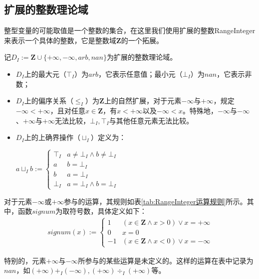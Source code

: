 \subsection{扩展的整数理论域}
\label{sec:Integer}

整型变量的可能取值是一个整数的集合，在这里我们使用扩展的整数RangeInteger来表示一个具体的整数，它是整数域$ \mathbf{Z} $的一个拓展。

\begin{definition}
	记$ D_I := \mathbf{Z} \cup \{ +\infty, -\infty, arb, nan\}  $为扩展的整数理论域。
	\begin{itemize}
		\item $ D_I $上的最大元（$ \top_I $）为$ arb $，它表示任意值；最小元（$ \bot_I $）为$ nan $，它表示非数；
		
		\item $ D_I $上的偏序关系（$ \le_I $）为$ \mathbf{Z} $上的自然扩展，对于元素$ -\infty $与$ +\infty $，规定$ -\infty < +\infty $，且对任意$ x \in \mathbf{Z} $，有$ x < +\infty $以及$ -\infty < x $。特殊地，$ -\infty $与$ -\infty $、$ +\infty $与$ +\infty $无法比较，$ \bot_I, \top_I $与其他任意元素无法比较。
		
		\item $ D_I $上的上确界操作（$ \sqcup_I $）定义为：\\
		\centerline{$ a \sqcup_I b := \begin{cases}
			\top_I & a \ne \bot_I \land b \ne \bot_I\\
			a & b = \bot_I\\
			b & a = \bot_I\\
			\bot_I & a = \bot_I \land b = \bot_I
			\end{cases} $}
	\end{itemize}
\end{definition}

对于元素$ -\infty $或$ +\infty $参与的运算，其规则如表\ref{tab:RangeInteger运算规则}所示。其中，函数$ signum $为取符号数，具体定义如下：
\begin{align}
	signum(x) := \begin{cases}
		1 & (x \in \mathbf{Z} \land x > 0) \lor x = +\infty\\
		0 & x = 0\\
		-1 & (x \in \mathbf{Z} \land x < 0) \lor x = -\infty
	\end{cases}
\end{align}

特别的，元素$ +\infty $与$ -\infty $所参与的某些运算是未定义的。这样的运算在表中记录为$ nan $，如$ (+\infty) +_I (-\infty), (+\infty) \div_I (+\infty)  $等。


